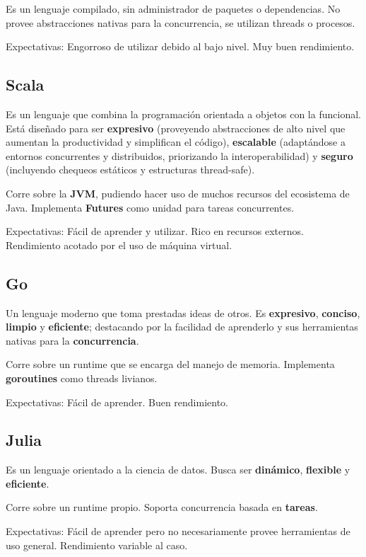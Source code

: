 \documentclass[11pt]{article}
\let\Oldsubsection\subsection
\renewcommand{\subsection}{\FloatBarrier\Oldsubsection}
\begin{document}
Es un lenguaje compilado, sin administrador de paquetes o dependencias. No provee abstracciones nativas para la concurrencia, se utilizan threads o procesos.

Expectativas: Engorroso de utilizar debido al bajo nivel. Muy buen rendimiento.

\subsection{Scala}

Es un lenguaje que combina la programación orientada a objetos con la funcional. Está diseñado para ser \textbf{expresivo} (proveyendo abstracciones de alto nivel que aumentan la productividad y simplifican el código), \textbf{escalable} (adaptándose a entornos concurrentes y distribuidos, priorizando la interoperabilidad) y \textbf{seguro} (incluyendo chequeos estáticos y estructuras thread-safe).

Corre sobre la \textbf{JVM}, pudiendo hacer uso de muchos recursos del ecosistema de Java. Implementa \textbf{Futures} como unidad para tareas concurrentes.

Expectativas: Fácil de aprender y utilizar. Rico en recursos externos. Rendimiento acotado por el uso de máquina virtual.

\subsection{Go}

Un lenguaje moderno que toma prestadas ideas de otros. Es \textbf{expresivo}, \textbf{conciso}, \textbf{limpio} y \textbf{eficiente}; destacando por la facilidad de aprenderlo y sus herramientas nativas para la \textbf{concurrencia}.

Corre sobre un runtime que se encarga del manejo de memoria. Implementa \textbf{goroutines} como threads livianos.

Expectativas: Fácil de aprender. Buen rendimiento.

\subsection{Julia}

Es un lenguaje orientado a la ciencia de datos. Busca ser \textbf{dinámico}, \textbf{flexible} y \textbf{eficiente}.

Corre sobre un runtime propio. Soporta concurrencia basada en \textbf{tareas}.

Expectativas: Fácil de aprender pero no necesariamente provee herramientas de uso general. Rendimiento variable al caso.
\end{document}
